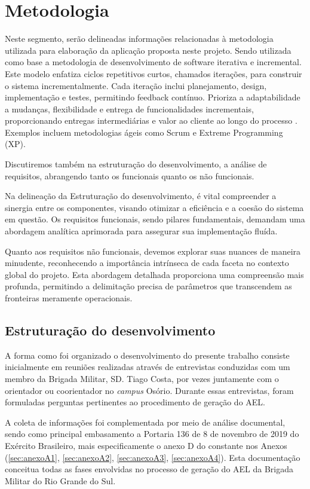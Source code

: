 \chapter{Metodologia}
Neste segmento, serão delineadas informações relacionadas à metodologia utilizada para elaboração da aplicação proposta neste projeto. 
Sendo utilizada como base a metodologia de desenvolvimento de software iterativa e incremental.
Este modelo enfatiza ciclos repetitivos curtos, chamados iterações, para construir o sistema incrementalmente. Cada iteração inclui planejamento, design, implementação e testes, permitindo feedback contínuo. 
Prioriza a adaptabilidade a mudanças, flexibilidade e entrega de funcionalidades incrementais, proporcionando entregas intermediárias e valor ao cliente ao longo do processo \cite{engenhariasw}.
Exemplos incluem metodologias ágeis como Scrum e Extreme Programming (XP). 

Discutiremos também na estruturação do desenvolvimento, a análise de requisitos, abrangendo tanto os funcionais quanto os não funcionais.

Na delineação da Estruturação do desenvolvimento, é vital compreender a sinergia entre os componentes, visando otimizar a eficiência e a coesão do sistema em questão. Os requisitos funcionais, sendo pilares fundamentais, demandam uma abordagem analítica aprimorada para assegurar sua implementação fluída.

Quanto aos requisitos não funcionais, devemos explorar suas nuances de maneira minudente, reconhecendo a importância intrínseca de cada faceta no contexto global do projeto. Esta abordagem detalhada proporciona uma compreensão mais profunda, permitindo a delimitação precisa de parâmetros que transcendem as fronteiras meramente operacionais.

\section{Estruturação do desenvolvimento}\label{sec:estruturacao-desenvolvimento}
    A forma como foi organizado o desenvolvimento do presente trabalho consiste inicialmente em reuniões realizadas através de entrevistas conduzidas com um membro da Brigada Militar, SD. Tiago Costa, por vezes juntamente com o orientador ou coorientador no \textit{campus} Osório. Durante essas entrevistas, foram formuladas perguntas pertinentes ao procedimento de geração do AEL.

A coleta de informações foi complementada por meio de análise documental, sendo como principal embasamento a Portaria 136 de 8 de novembro de 2019 do Exército Brasileiro, mais especificamente o anexo D do  constante nos Anexos (\ref{sec:anexoA1}, \ref{sec:anexoA2}, \ref{sec:anexoA3}, \ref{sec:anexoA4}). Esta documentação conceitua todas as fases envolvidas no processo de geração do AEL da Brigada Militar do Rio Grande do Sul.

